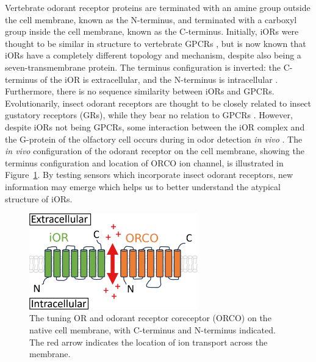 \documentclass[
  a4paper,
]{scrbook}
\begin{document}
Vertebrate odorant receptor proteins are terminated with an amine group
outside the cell membrane, known as the N-terminus, and terminated with
a carboxyl group inside the cell membrane, known as the C-terminus.
Initially, iORs were thought to be similar in structure to vertebrate
GPCRs \autocite{Clyne1999}, but is now known that iORs have a completely
different topology and mechanism, despite also being a
seven-transmembrane protein. The terminus configuration is inverted: the
C-terminus of the iOR is extracellular, and the N-terminus is
intracellular
\autocite{Smart2008,Glatz2011,Carraher2015,Brito2016,Wicher2021}.
Furthermore, there is no sequence similarity between iORs and GPCRs.
Evolutionarily, insect odorant receptors are thought to be closely
related to insect gustatory receptors (GRs), while they bear no relation
to GPCRs \autocite{Glatz2011,Carraher2015,Wicher2021}. However, despite
iORs not being GPCRs, some interaction between the iOR complex and the
G-protein of the olfactory cell occurs during in odor detection \emph{in
vivo} \autocite{Wicher2008,Wicher2021}. The \emph{in vivo} configuration
of the odorant receptor on the cell membrane, showing the terminus
configuration and location of ORCO ion channel, is illustrated in
Figure~\ref{fig-iOR-membrane}. By testing sensors which incorporate
insect odorant receptors, new information may emerge which helps us to
better understand the atypical structure of iORs.

\begin{figure}

{\centering \includegraphics[width=0.65\textwidth,height=\textheight]{figures/ch3/OR_diagram.png}

}

\caption[The tuning OR and odorant receptor coreceptor (ORCO) on the
native cell membrane, with C-terminus and N-terminus
indicated.]{\label{fig-iOR-membrane}The tuning OR and odorant receptor
coreceptor (ORCO) on the native cell membrane, with C-terminus and
N-terminus indicated. The red arrow indicates the location of ion
transport across the membrane.}

\end{figure}
\end{document}
